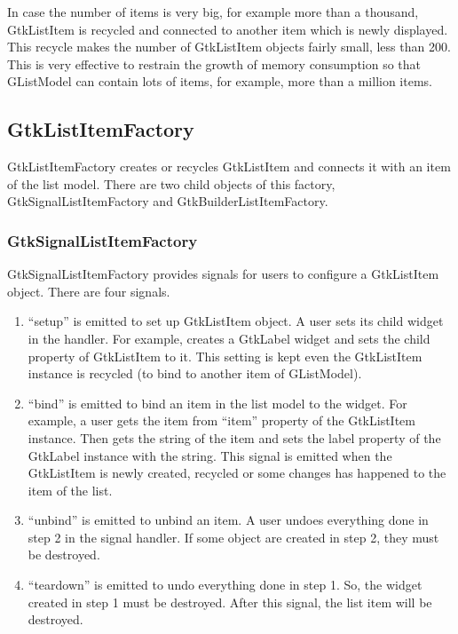 In case the number of items is very big, for example more than a
thousand, GtkListItem is recycled and connected to another item which is
newly displayed. This recycle makes the number of GtkListItem objects
fairly small, less than 200. This is very effective to restrain the
growth of memory consumption so that GListModel can contain lots of
items, for example, more than a million items.

\hypertarget{gtklistitemfactory}{%
\subsection{GtkListItemFactory}\label{gtklistitemfactory}}

GtkListItemFactory creates or recycles GtkListItem and connects it with
an item of the list model. There are two child objects of this factory,
GtkSignalListItemFactory and GtkBuilderListItemFactory.

\hypertarget{gtksignallistitemfactory}{%
\subsubsection{GtkSignalListItemFactory}\label{gtksignallistitemfactory}}

GtkSignalListItemFactory provides signals for users to configure a
GtkListItem object. There are four signals.

\begin{enumerate}
\def\labelenumi{\arabic{enumi}.}
\tightlist
\item
  ``setup'' is emitted to set up GtkListItem object. A user sets its
  child widget in the handler. For example, creates a GtkLabel widget
  and sets the child property of GtkListItem to it. This setting is kept
  even the GtkListItem instance is recycled (to bind to another item of
  GListModel).
\item
  ``bind'' is emitted to bind an item in the list model to the widget.
  For example, a user gets the item from ``item'' property of the
  GtkListItem instance. Then gets the string of the item and sets the
  label property of the GtkLabel instance with the string. This signal
  is emitted when the GtkListItem is newly created, recycled or some
  changes has happened to the item of the list.
\item
  ``unbind'' is emitted to unbind an item. A user undoes everything done
  in step 2 in the signal handler. If some object are created in step 2,
  they must be destroyed.
\item
  ``teardown'' is emitted to undo everything done in step 1. So, the
  widget created in step 1 must be destroyed. After this signal, the
  list item will be destroyed.
\end{enumerate}

